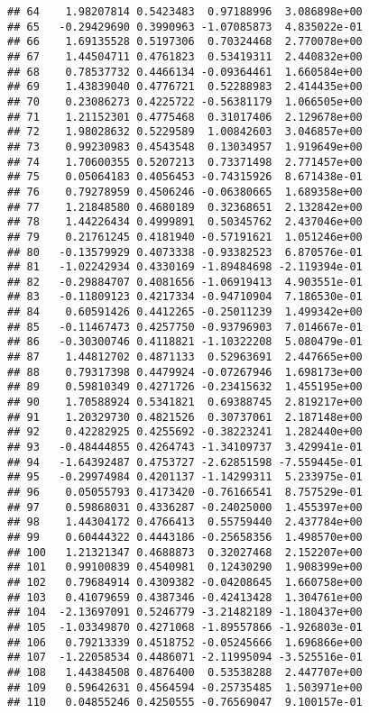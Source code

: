 \documentclass[
]{article}
\begin{document}
\begin{verbatim}
## 64    1.98207814 0.5423483  0.97188996  3.086898e+00
## 65   -0.29429690 0.3990963 -1.07085873  4.835022e-01
## 66    1.69135528 0.5197306  0.70324468  2.770078e+00
## 67    1.44504711 0.4761823  0.53419311  2.440832e+00
## 68    0.78537732 0.4466134 -0.09364461  1.660584e+00
## 69    1.43839040 0.4776721  0.52288983  2.414435e+00
## 70    0.23086273 0.4225722 -0.56381179  1.066505e+00
## 71    1.21152301 0.4775468  0.31017406  2.129678e+00
## 72    1.98028632 0.5229589  1.00842603  3.046857e+00
## 73    0.99230983 0.4543548  0.13034957  1.919649e+00
## 74    1.70600355 0.5207213  0.73371498  2.771457e+00
## 75    0.05064183 0.4056453 -0.74315926  8.671438e-01
## 76    0.79278959 0.4506246 -0.06380665  1.689358e+00
## 77    1.21848580 0.4680189  0.32368651  2.132842e+00
## 78    1.44226434 0.4999891  0.50345762  2.437046e+00
## 79    0.21761245 0.4181940 -0.57191621  1.051246e+00
## 80   -0.13579929 0.4073338 -0.93382523  6.870576e-01
## 81   -1.02242934 0.4330169 -1.89484698 -2.119394e-01
## 82   -0.29884707 0.4081656 -1.06919413  4.903551e-01
## 83   -0.11809123 0.4217334 -0.94710904  7.186530e-01
## 84    0.60591426 0.4412265 -0.25011239  1.499342e+00
## 85   -0.11467473 0.4257750 -0.93796903  7.014667e-01
## 86   -0.30300746 0.4118821 -1.10322208  5.080479e-01
## 87    1.44812702 0.4871133  0.52963691  2.447665e+00
## 88    0.79317398 0.4479924 -0.07267946  1.698173e+00
## 89    0.59810349 0.4271726 -0.23415632  1.455195e+00
## 90    1.70588924 0.5341821  0.69388745  2.819217e+00
## 91    1.20329730 0.4821526  0.30737061  2.187148e+00
## 92    0.42282925 0.4255692 -0.38223241  1.282440e+00
## 93   -0.48444855 0.4264743 -1.34109737  3.429941e-01
## 94   -1.64392487 0.4753727 -2.62851598 -7.559445e-01
## 95   -0.29974984 0.4201137 -1.14299311  5.233975e-01
## 96    0.05055793 0.4173420 -0.76166541  8.757529e-01
## 97    0.59868031 0.4336287 -0.24025000  1.455397e+00
## 98    1.44304172 0.4766413  0.55759440  2.437784e+00
## 99    0.60444322 0.4443186 -0.25658356  1.498570e+00
## 100   1.21321347 0.4688873  0.32027468  2.152207e+00
## 101   0.99100839 0.4540981  0.12430290  1.908399e+00
## 102   0.79684914 0.4309382 -0.04208645  1.660758e+00
## 103   0.41079659 0.4387346 -0.42413428  1.304761e+00
## 104  -2.13697091 0.5246779 -3.21482189 -1.180437e+00
## 105  -1.03349870 0.4271068 -1.89557866 -1.926803e-01
## 106   0.79213339 0.4518752 -0.05245666  1.696866e+00
## 107  -1.22058534 0.4486071 -2.11995094 -3.525516e-01
## 108   1.44384508 0.4876400  0.53538288  2.447707e+00
## 109   0.59642631 0.4564594 -0.25735485  1.503971e+00
## 110   0.04855246 0.4250555 -0.76569047  9.100157e-01

\end{verbatim}
\end{document}
